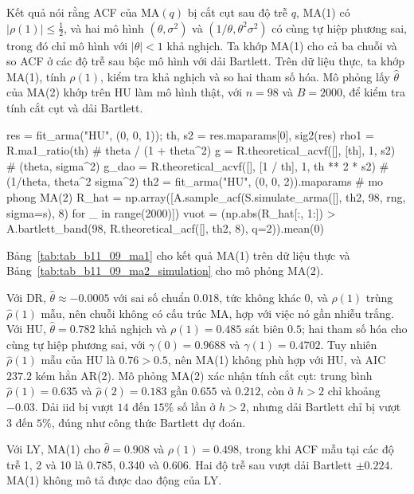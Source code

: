  Kết quả  nói rằng ACF của MA$(q)$ bị cắt cụt sau độ trễ $q$, MA(1) có $|\rho(1)|\le\tfrac12$, và hai mô hình $(\theta,\sigma^2)$ và $(1/\theta,\theta^2\sigma^2)$ có cùng tự hiệp phương sai, trong đó chỉ mô hình với $|\theta|<1$ khả nghịch.
 Ta khớp MA(1) cho cả ba chuỗi và so ACF ở các độ trễ sau bậc mô hình với dải Bartlett. Trên dữ liệu thực, ta khớp MA(1), tính $\rho(1)$, kiểm tra khả nghịch và so hai tham số hóa. Mô phỏng lấy $\hat\theta$ của MA(2) khớp trên HU làm mô hình thật, với $n=98$ và $B=2000$, để kiểm tra tính cắt cụt và dải Bartlett.
\begin{codeblock}
res = fit_arma("HU", (0, 0, 1)); th, s2 = res.maparams[0], sig2(res)
rho1 = R.ma1_ratio(th)                                   # theta / (1 + theta^2)
g = R.theoretical_acvf([], [th], 1, s2)                   # (theta, sigma^2)
g_dao = R.theoretical_acvf([], [1 / th], 1, th ** 2 * s2) # (1/theta, theta^2 sigma^2)
th2 = fit_arma("HU", (0, 0, 2)).maparams                  # mo phong MA(2)
R_hat = np.array([A.sample_acf(S.simulate_arma([], th2, 98, rng, sigma=s), 8) for _ in range(2000)])
vuot = (np.abs(R_hat[:, 1:]) > A.bartlett_band(98, R.theoretical_acf([], th2, 8), q=2)).mean(0)
\end{codeblock}
 Bảng~\ref{tab:tab_b11_09_ma1} cho kết quả MA(1) trên dữ liệu thực và Bảng~\ref{tab:tab_b11_09_ma2_simulation} cho mô phỏng MA(2).


 Với DR, $\hat\theta\approx-0.0005$ với sai số chuẩn $0.018$, tức không khác $0$, và $\rho(1)$ trùng $\hat\rho(1)$ mẫu, nên chuỗi không có cấu trúc MA, hợp với việc nó gần nhiễu trắng. Với HU, $\hat\theta=0.782$ khả nghịch và $\rho(1)=0.485$ sát biên $0.5$; hai tham số hóa cho cùng tự hiệp phương sai, với $\gamma(0)=0.9688$ và $\gamma(1)=0.4702$. Tuy nhiên $\hat\rho(1)$ mẫu của HU là $0.76>0.5$, nên MA(1) không phù hợp với HU, và AIC $237.2$ kém hẳn AR(2). Mô phỏng MA(2) xác nhận tính cắt cụt: trung bình $\hat\rho(1)=0.635$ và $\hat\rho(2)=0.183$ gần $0.655$ và $0.212$, còn ở $h>2$ chỉ khoảng $-0.03$. Dải iid bị vượt $14$ đến $15\%$ số lần ở $h>2$, nhưng dải Bartlett chỉ bị vượt $3$ đến $5\%$, đúng như công thức Bartlett dự đoán.

Với LY, MA(1) cho $\hat\theta=0.908$ và $\rho(1)=0.498$, trong khi ACF mẫu tại các độ trễ 1, 2 và 10 là 0.785, 0.340 và 0.606. Hai độ trễ sau vượt dải Bartlett $\pm0.224$. MA(1) không mô tả được dao động của LY.


